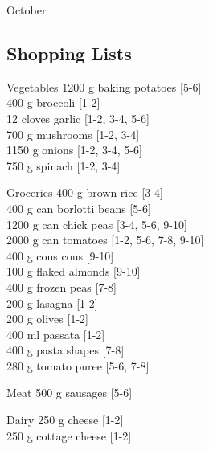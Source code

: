 \begin{menu}{October}
    \subsection*{Shopping Lists}
      \begin{shoppinglist}{Vegetables}
      1200 g baking potatoes {\scriptsize[5-6]}\\
      400 g broccoli {\scriptsize[1-2]}\\
      12 cloves garlic {\scriptsize[1-2, 3-4, 5-6]}\\
      700 g mushrooms {\scriptsize[1-2, 3-4]}\\
      1150 g onions {\scriptsize[1-2, 3-4, 5-6]}\\
      750 g spinach {\scriptsize[1-2, 3-4]}\\
      \end{shoppinglist}%
      \begin{shoppinglist}{Groceries}
      400 g brown rice {\scriptsize[3-4]}\\
      400 g can borlotti beans {\scriptsize[5-6]}\\
      1200 g can chick peas {\scriptsize[3-4, 5-6, 9-10]}\\
      2000 g can tomatoes {\scriptsize[1-2, 5-6, 7-8, 9-10]}\\
      400 g cous cous {\scriptsize[9-10]}\\
      100 g flaked almonds {\scriptsize[9-10]}\\
      400 g frozen peas {\scriptsize[7-8]}\\
      200 g lasagna {\scriptsize[1-2]}\\
      200 g olives {\scriptsize[1-2]}\\
      400 ml passata {\scriptsize[1-2]}\\
      400 g pasta shapes {\scriptsize[7-8]}\\
      280 g tomato puree {\scriptsize[5-6, 7-8]}\\
      \end{shoppinglist}%
      \par\vfil %
      \begin{shoppinglist}{Meat}
      500 g sausages {\scriptsize[5-6]}\\
      \end{shoppinglist}%
      \begin{shoppinglist}{Dairy}
      250 g cheese {\scriptsize[1-2]}\\
      250 g cottage cheese {\scriptsize[1-2]}\\

\end{shoppinglist}
\end{menu}
